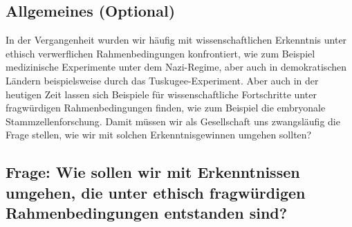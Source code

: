 \documentclass[twoside, a4paper, DIV=11, open=any, bibliography=totoc]{scrbook}
\begin{document}
\subsection{Allgemeines (Optional)}

In der Vergangenheit wurden wir häufig mit wissenschaftlichen Erkenntnis unter
ethisch verwerflichen Rahmenbedingungen konfrontiert, wie zum Beispiel medizinische
Experimente unter dem Nazi-Regime, aber auch in demokratischen Ländern beispielsweise durch das Tuskugee-Experiment.
Aber auch in der heutigen Zeit lassen sich Beispiele für wissenschaftliche Fortschritte
unter fragwürdigen Rahmenbedingungen finden, wie zum Beispiel die embryonale Stammzellenforschung.
Damit müssen wir als Gesellschaft uns zwangsläufig die Frage stellen, wie wir mit solchen Erkenntnisgewinnen
umgehen sollten?

%

\subsection{Frage: Wie sollen wir mit Erkenntnissen umgehen, die unter ethisch fragwürdigen Rahmenbedingungen entstanden sind?}
\end{document}
